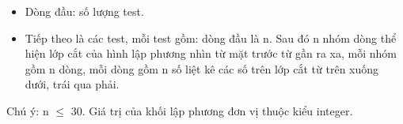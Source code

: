\begin{itemize}
	\item Dòng đầu: số lượng test.
	\item Tiếp theo là các test, mỗi test gồm: dòng đầu là n. Sau đó n nhóm dòng thể hiện lớp cắt của hình lập phương nhìn từ mặt trước từ gần ra xa, mỗi nhóm gồm n dòng, mỗi dòng gồm n số liệt kê các số trên lớp cắt từ trên xuống dưới, trái qua phải.
\end{itemize}

Chú ý: n  $\le$  30. Giá trị của khối lập phương đơn vị thuộc kiểu integer.

\